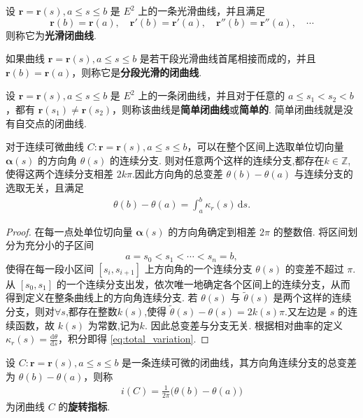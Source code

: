 \documentclass[../../main.tex]{subfiles}%
\begin{document}
\begin{definition}[光滑闭曲线]
设 $\bm{r}=\bm{r}(s), a\leqslant s\leqslant b$ 是 $E^2$ 上的一条光滑曲线，并且满足
\[
\bm{r}(b)=\bm{r}(a),\quad \bm{r}'(b)=\bm{r}'(a),\quad \bm{r}''(b)=\bm{r}''(a),\quad \cdots
\]
则称它为\textbf{光滑闭曲线}.
\end{definition}

\begin{definition}[分段光滑闭曲线]
如果曲线 $\bm{r}=\bm{r}(s), a\leqslant s\leqslant b$ 是若干段光滑曲线首尾相接而成的，并且 $\bm{r}(b)=\bm{r}(a)$，则称它是\textbf{分段光滑的闭曲线}.
\end{definition}

\begin{definition}[简单闭曲线]
设 $\bm{r}=\bm{r}(s), a\leqslant s\leqslant b$ 是 $E^2$ 上的一条闭曲线，并且对于任意的 $a\leqslant s_1<s_2<b$，都有 $\bm{r}(s_1)\neq\bm{r}(s_2)$，则称该曲线是\textbf{简单闭曲线}或\textbf{简单的}. 简单闭曲线就是没有自交点的闭曲线.
\end{definition}

\begin{theorem}
对于连续可微曲线 $C:\bm{r}=\bm{r}(s),a\leqslant s\leqslant b$，可以在整个区间上选取单位切向量 $\bm{\alpha}(s)$ 的方向角 $\theta(s)$ 的连续分支. 则对任意两个这样的连续分支,都存在$k\in \mathbb{Z}$,使得这两个连续分支相差 $2k\pi$.因此方向角的总变差 $\theta(b)-\theta(a)$ 与连续分支的选取无关，且满足
\begin{align}
\theta(b)-\theta(a)=\int_a^b \kappa_r(s)\,\mathrm{d}s. \label{eq:total_variation}
\end{align}
\end{theorem}
\begin{proof}

在每一点处单位切向量 $\bm{\alpha}(s)$ 的方向角确定到相差 $2\pi$ 的整数倍. 将区间划分为充分小的子区间
\[
a=s_0<s_1<\cdots<s_n=b,
\]
使得在每一段小区间 $[s_i,s_{i+1}]$ 上方向角的一个连续分支 $\theta(s)$ 的变差不超过 $\pi$. 从 $[s_0,s_1]$ 的一个连续分支出发，依次唯一地确定各个区间上的连续分支，从而得到定义在整条曲线上的方向角连续分支. 若 $\theta(s)$ 与 $\tilde{\theta}(s)$ 是两个这样的连续分支，则对$\forall s$,都存在整数$k(s)$,使得 $\tilde{\theta}(s)-\theta(s)=2k(s)\pi$.又左边是 $s$ 的连续函数，故 $k(s)$ 为常数,记为$k$. 因此总变差与分支无关. 根据相对曲率的定义 $\kappa_r(s)=\frac{\mathrm{d}\theta}{\mathrm{d}s}$，积分即得 \eqref{eq:total_variation}.

\end{proof}

\begin{definition}[旋转指标]
设 $C:\bm{r}=\bm{r}(s),a\leqslant s\leqslant b$ 是一条连续可微的闭曲线，其方向角连续分支的总变差为 $\theta(b)-\theta(a)$，则称
\begin{align}
i(C)=\frac{1}{2\pi}\bigl(\theta(b)-\theta(a)\bigr) \label{eq:rotation_index}
\end{align}
为闭曲线 $C$ 的\textbf{旋转指标}.
\end{definition}
\end{document}
